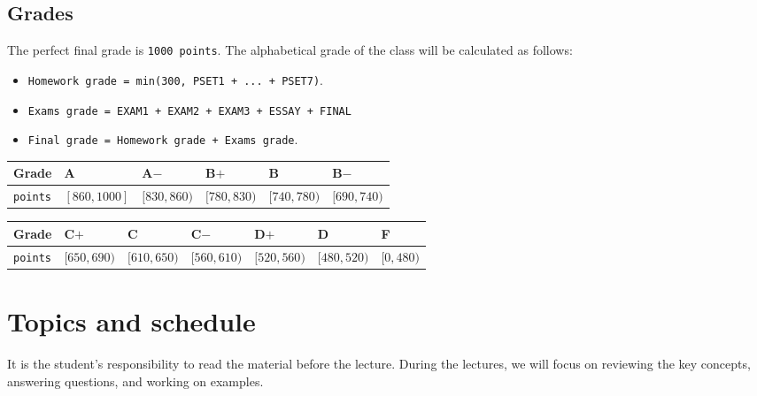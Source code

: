 \documentclass[11pt]{article}
\begin{document}
\subsection*{Grades}
\label{sec:org1e6fd27}
The perfect final grade is \texttt{1000 points}. The alphabetical grade of the class
will be calculated as follows:
\begin{itemize}
\item \texttt{Homework grade = min(300, PSET1 + ... + PSET7)}.
\item \texttt{Exams grade = EXAM1 + EXAM2 + EXAM3 + ESSAY + FINAL}
\item \texttt{Final grade = Homework grade + Exams grade}.
\end{itemize}

\begin{center}
\begin{tabular}{l|lllll}
\textbf{Grade} & A & A\(-\) & B\(+\) & B & B\(-\)\\[0pt]
\hline
\texttt{points} & \([860,1000]\) & \([830,860)\) & \([780,830)\) & \([740,780)\) & \([690,740)\)\\[0pt]
\end{tabular}
\end{center}


\begin{center}
\begin{tabular}{l|llllll}
\textbf{Grade} & C\(+\) & C & C\(-\) & D\(+\) & D & F\\[0pt]
\hline
\texttt{points} & \([650,690)\) & \([610,650)\) & \([560,610)\) & \([520,560)\) & \([480,520)\) & \([0,480)\)\\[0pt]
\end{tabular}
\end{center}

\section*{Topics and schedule}
\label{sec:org1437e52}
It is the student's responsibility to read the material before the lecture.
During the lectures, we will focus on reviewing the key concepts, answering
questions, and working on examples.
\end{document}
